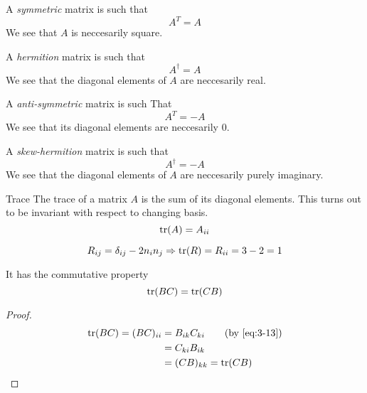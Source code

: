 \documentclass{article}
\numberwithin{equation}{section}
\begin{document}
\begin{enumdescript}
    \begin{defi}
        A \emph{symmetric} matrix is such that 
        \[
            A^T = A
        \]
        We see that $A$ is neccesarily square.
    \end{defi}
    
    \begin{defi}
        A \emph{hermition} matrix is such that
        \[
            A^\dagger = A
        \]
        We see that the diagonal elements of $A$ are neccesarily real.
    \end{defi}
    
    \begin{defi}
        A \emph{anti-symmetric} matrix is such That        
        \[
            A^T = -A
        \]
        We see that its diagonal elements are neccesarily $0$.
    \end{defi}
    
    \begin{defi}
        A \emph{skew-hermition} matrix is such that
        \[
            A^\dagger = -A
        \]
        We see that the diagonal elements of $A$ are neccesarily purely imaginary.
    \end{defi}

    \item[Trace] The trace of a matrix $A$ is the sum of its diagonal elements. 
    This turns out to be invariant with respect to changing basis.
    \[
        \operatorname{tr}(A) = A_{ii}
    \]
    \begin{eg}
        \[
            R_{ij} = \delta_{ij} - 2n_in_j \Rightarrow \operatorname{tr}(R) = R_{ii} = 3 -2 = 1  
        \]
    \end{eg}
    It has the commutative property
    \begin{equation}\label{eq:3-16}
        \operatorname{tr}(BC) = \operatorname{tr}(CB)
    \end{equation}
    \begin{proof}
        \begin{align*}
            \tr(BC) = (BC)_{ii} &= B_{ik}C_{ki} \tag{by \eqref{eq:3-13}}\\
            &= C_{ki}B_{ik} \\
            &= (CB)_{kk} = \tr(CB)\\
        \end{align*}
    \end{proof}


\end{enumdescript}
\end{document}
